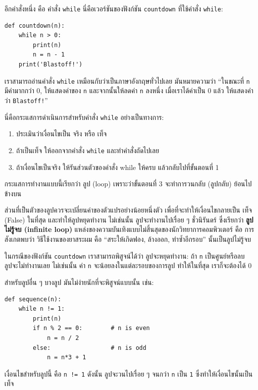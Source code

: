 อีกคำสั่งหนึ่ง คือ คำสั่ง {\tt while} นี่คือเวอร์ชันของฟังก์ชัน {\tt countdown} ที่ใช้คำสั่ง {\tt while}:

\begin{verbatim}
def countdown(n):
    while n > 0:
        print(n)
        n = n - 1
    print('Blastoff!')
\end{verbatim}
%
เราสามารถอ่านคำสั่ง {\tt while} เหมือนกับว่าเป็นภาษาอังกฤษทั่วไปเลย มันหมายความว่า
``ในขณะที่ {\tt n} มีค่ามากกว่า 0, ให้แสดงค่าของ {\tt n} และจากนั้นให้ลดค่า {\tt n} ลงหนึ่ง
เมื่อเราได้ค่าเป็น 0 แล้ว ให้แสดงคำว่า {\tt Blastoff!}''

นี่คือกระแสการดำเนินการสำหรับคำสั่ง {\tt while} อย่างเป็นทางการ:

\begin{enumerate}

\item ประเมินว่าเงื่อนไขเป็น จริง หรือ เท็จ

\item ถ้าเป็นเท็จ ให้ออกจากคำสั่ง {\tt while}
และทำคำสั่งถัดไปเลย

\item ถ้าเงื่อนไขเป็นจริง ให้รันส่วนตัวของคำสั่ง while ให้ครบ
แล้วกลับไปที่ขั้นตอนที่ 1

\end{enumerate}

กระแสการทำงานแบบนี้เรียกว่า ลูป (loop) เพราะว่าขั้นตอนที่ 3 จะทำการวนกลับ (ลูปกลับ) ย้อนไปข้างบน


ส่วนที่เป็นตัวของลูปควรจะเปลี่ยนค่าของตัวแปรอย่างน้อยหนึ่งตัว เพื่อที่จะทำให้เงื่อนไขกลายเป็น 
เท็จ (False) ในที่สุด และทำให้ลูปหยุดทำงาน  ไม่เช่นนั้น ลูปจะทำงานไปเรื่อย ๆ ชั่วนิรันดร์ ซึ่งเรียกว่า
{\bf ลูปไม่รู้จบ (infinite loop)}  แหล่งของความบันเทิงแบบไม่สิ้นสุดของนักวิทยาการคอมพิวเตอร์
คือ การสังเกตพบว่า วิธีใช้งานของยาสระผม คือ ``สระให้เกิดฟอง, ล้างออก, ทำซ้ำอีกรอบ'' นั้นเป็นลูปไม่รู้จบ

ในกรณีของฟังก์ชัน {\tt countdown} เราสามารถพิสูจน์ได้ว่า ลูปจะหยุดทำงาน: ถ้า {\tt n} เป็นศูนย์หรือลบ
ลูปจะไม่ทำงานเลย ไม่เช่นนั้น ค่า {\tt n} จะน้อยลงในแต่ละรอบของการลูป ทำให้ในที่สุด เราก็จะต้องได้ 0

สำหรับลูปอื่น ๆ บางลูป มันไม่ง่ายนักที่จะพิสูจน์แบบนั้น เช่น:

\begin{verbatim}
def sequence(n):
    while n != 1:
        print(n)
        if n % 2 == 0:        # n is even
            n = n / 2
        else:                 # n is odd
            n = n*3 + 1
\end{verbatim}
%
เงื่อนไขสำหรับลูปนี้ คือ {\tt n != 1} ดังนั้น ลูปจะวนไปเรื่อย ๆ จนกว่า {\tt n} เป็น {\tt 1}
ซึ่งทำให้เงื่อนไขนั้นเป็นเท็จ

